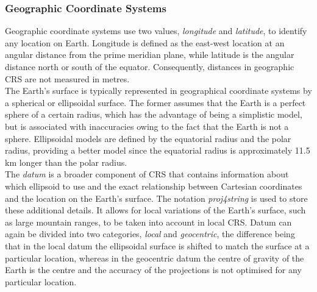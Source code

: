\subsubsection*{Geographic Coordinate Systems}
Geographic coordinate systems use two values, \textit{longitude} and \textit{latitude}, to identify any location on Earth. Longitude is defined as the east-west location at an angular distance from the prime meridian plane, while latitude is the angular distance north or south of the equator. Consequently, distances in geographic CRS are not measured in metres. \\
The Earth's surface is typically represented in geographical coordinate systems by a spherical or ellipsoidal surface. The former assumes that the Earth is a perfect sphere of a certain radius, which has the advantage of being a simplistic model, but is associated with inaccuracies owing to the fact that the Earth is not a sphere. Ellipsoidal models are defined by the equatorial radius and the polar radius, providing a better model since the equatorial radius is approximately 11.5 km longer than the polar radius.\\
The \textit{datum} is a broader component of CRS that contains information about which ellipsoid to use and the exact relationship between Cartesian coordinates and the location on the Earth's surface. The notation \textit{proj4string} is used to store these additional details. It allows for local variations of the Earth's surface, such as large mountain ranges, to be taken into account in local CRS. Datum can again be divided into two categories, \textit{local} and \textit{geocentric}, the difference being that in the local datum the ellipsoidal surface is shifted to match the surface at a particular location, whereas in the geocentric datum the centre of gravity of the Earth is the centre and the accuracy of the projections is not optimised for any particular location.
